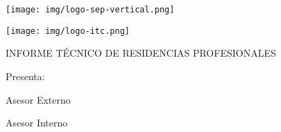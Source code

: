 \begin{titlepage}
    \begin{center}
        \begin{minipage}{0.25\textwidth} %
            \begin{flushleft}
                \texttt{[image: img/logo-sep-vertical.png]} %
            \end{flushleft}
        \end{minipage}
        \hfill
        \begin{minipage}{0.4\textwidth} %
            \begin{center}
                \MakeUppercase{\nombreUniversidad}
            \end{center}
        \end{minipage}
        \hfill
        \begin{minipage}{0.25\textwidth} %
            \begin{flushright}
                \texttt{[image: img/logo-itc.png]} %
            \end{flushright}
        \end{minipage}
        
        \vspace{0.8cm}
        \MakeUppercase{Informe técnico de residencias profesionales}

        \nombreProyecto{}

        \vspace{0.8cm}
        \fechaInicioResidencia{} \textendash{} \fechaFinResidencia{}

        \nombreEmpresa{}

        \vspace{0.8cm}
        Presenta:

        \nombreAutor{}

        \numeroControl{}

        \especialidad{}

        \vspace{0.8cm}
        Asesor Externo

        \nombreAsesorExterno{}

        \vspace{0.8cm}
        Asesor Interno

        \nombreAsesorInterno{}

        \vspace{0.8cm}
        \fechaPresentacion{}
    \end{center}
\end{titlepage}